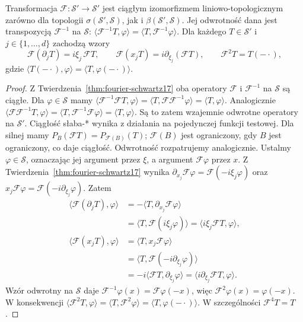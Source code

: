 \begin{twierdzenie}
\label{thm:fourier-auto-tempered22}
Transformacja $\mathcal F:\mathcal S'\to\mathcal S'$
jest ciągłym izomorfizmem liniowo-topologicznym
zarówno dla topologii $\sigma(\mathcal S',\mathcal S)$,
jak i $\beta(\mathcal S',\mathcal S)$.
Jej odwrotność dana jest transpozycją
$\mathcal F^{-1}$ na $\mathcal S$:
$\langle\mathcal F^{-1}T,\varphi\rangle
=\langle T,\mathcal F^{-1}\varphi\rangle$.
Dla każdego $T\in\mathcal S'$ i $j\in\{1,\ldots,d\}$
zachodzą wzory
\[
\mathcal F(\partial_jT)=i\xi_j\,\mathcal F T,
\qquad
\mathcal F(x_jT)=i\partial_{\xi_j}(\mathcal F T),
\qquad\mathcal F^2T=T(-\cdot),
\]
gdzie $\langle T(-\cdot),\varphi\rangle=
\langle T,\varphi(-\cdot)\rangle$.
\end{twierdzenie}
\begin{proof}
Z Twierdzenia~\ref{thm:fourier-schwartz17} oba operatory
$\mathcal F$ i $\mathcal F^{-1}$ na $\mathcal S$ są
ciągłe. Dla $\varphi\in\mathcal S$ mamy
$\langle\mathcal F^{-1}\mathcal FT,\varphi\rangle
=\langle T,\mathcal F\mathcal F^{-1}\varphi\rangle
=\langle T,\varphi\rangle$.
Analogicznie
$\langle\mathcal F\mathcal F^{-1}T,\varphi\rangle
=\langle T,\mathcal F^{-1}\mathcal F\varphi\rangle
=\langle T,\varphi\rangle$.
Są to zatem wzajemnie odwrotne operatory na $\mathcal S'$.
Ciągłość słaba-* wynika z działania na pojedynczej
funkcji testowej. Dla silnej mamy
$P_B(\mathcal FT)=P_{\mathcal F(B)}(T)$;
$\mathcal F(B)$ jest ograniczony, gdy $B$ jest ograniczony,
co daje ciągłość. Odwrotność rozpatrujemy analogicznie.
Ustalmy $\varphi\in\mathcal S$, oznaczając jej argument
przez $\xi$, a argument $\mathcal F\varphi$ przez $x$.
Z Twierdzenia~\ref{thm:fourier-schwartz17} wynika
$\partial_{x_j}\mathcal F\varphi
=\mathcal F(-i\xi_j\varphi)$ oraz
$x_j\mathcal F\varphi=\mathcal F(-i\partial_{\xi_j}\varphi)$.
Zatem
\[
\begin{aligned}
\langle\mathcal F(\partial_jT),\varphi\rangle
&=-\langle T,\partial_{x_j}\mathcal F\varphi\rangle\\
&=\langle T,\mathcal F(i\xi_j\varphi)\rangle
=\langle i\xi_j\mathcal FT,\varphi\rangle,\\
\langle\mathcal F(x_jT),\varphi\rangle
&=\langle T,x_j\mathcal F\varphi\rangle\\
&=\langle T,\mathcal F(-i\partial_{\xi_j}\varphi)\rangle\\
&=-i\langle\mathcal FT,\partial_{\xi_j}\varphi\rangle
=\langle i\partial_{\xi_j}\mathcal FT,\varphi\rangle.
\end{aligned}
\]
Wzór odwrotny na $\mathcal S$ daje
$\mathcal F^{-1}\varphi(x)=\mathcal F\varphi(-x)$,
więc $\mathcal F^2\varphi(x)=\varphi(-x)$.
W konsekwencji
$\langle\mathcal F^2T,\varphi\rangle
=\langle T,\mathcal F^2\varphi\rangle
=\langle T,\varphi(-\cdot)\rangle$.
W szczególności $\mathcal F^4T=T$.
\end{proof}


